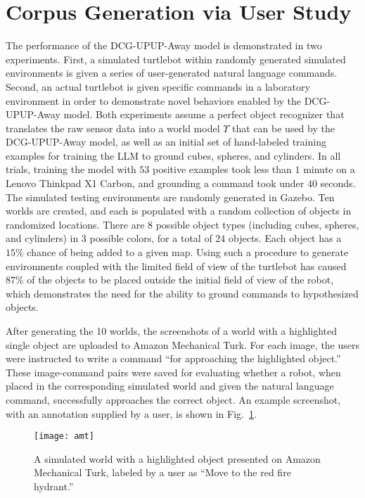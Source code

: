 \section{Corpus Generation via User Study}
\label{sec:evaluation}
The performance of the DCG-UPUP-Away model is demonstrated in two experiments.
First, a simulated turtlebot within randomly generated simulated environments is given a series of user-generated natural language commands.
Second, an actual turtlebot is given specific commands in a laboratory environment in order to demonstrate novel behaviors enabled by the DCG-UPUP-Away model.
Both experiments assume a perfect object recognizer that translates the raw sensor data into a world model $\Upsilon$ that can be used by the DCG-UPUP-Away model, as well as an initial set of hand-labeled training examples for training the LLM to ground cubes, spheres, and cylinders.
In all trials, training the model with $53$ positive examples took less than $1$ minute on a Lenovo Thinkpad X1 Carbon, and grounding a command took under $40$ seconds.
The simulated testing environments are randomly generated in Gazebo.
Ten worlds are created, and each is populated with a random collection of objects in randomized locations.
There are $8$ possible object types (including cubes, spheres, and cylinders) in $3$ possible colors, for a total of $24$ objects.
Each object has a $15\%$ chance of being added to a given map.
Using such a procedure to generate environments coupled with the limited field of view of the turtlebot has caused $87\%$ of the objects to be placed outside the initial field of view of the robot, which demonstrates the need for the ability to ground commands to hypothesized objects.

After generating the 10 worlds, the screenshots of a world with a highlighted single object are uploaded to Amazon Mechanical Turk. For each image, the users were instructed to write a command ``for approaching the highlighted object.''
These image-command pairs were saved for evaluating whether a robot, when placed in the corresponding simulated world and given the natural language command, successfully approaches the correct object.
An example screenshot, with an annotation supplied by a user, is shown in Fig.~\ref{fig:amt}.
\begin{figure}[h]
	\centering
    \texttt{[image: amt]}
	\caption{A simulated world with a highlighted object presented on Amazon Mechanical Turk, labeled by a user as ``Move to the red fire hydrant.''}
	\label{fig:amt}
\end{figure}


